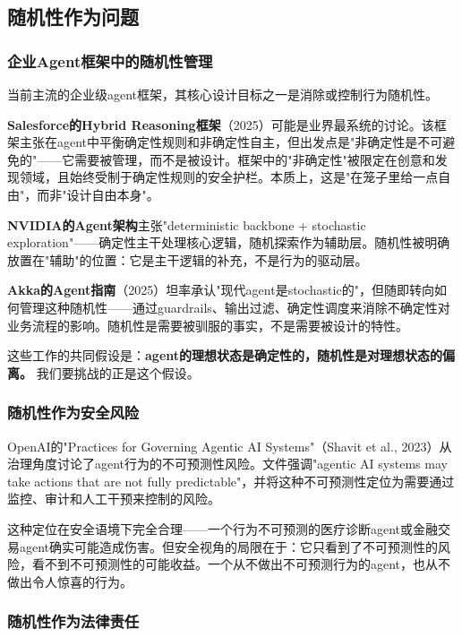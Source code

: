 \documentclass[12pt,a4paper]{ctexart}
\begin{document}
\subsection{随机性作为问题}

\subsubsection{企业Agent框架中的随机性管理}

当前主流的企业级agent框架，其核心设计目标之一是消除或控制行为随机性。

\textbf{Salesforce的Hybrid Reasoning框架}（2025）\cite{salesforce2025}可能是业界最系统的讨论。该框架主张在agent中平衡确定性规则和非确定性自主，但出发点是"非确定性是不可避免的"——它需要被管理，而不是被设计。框架中的"非确定性"被限定在创意和发现领域，且始终受制于确定性规则的安全护栏。本质上，这是"在笼子里给一点自由"，而非"设计自由本身"。

\textbf{NVIDIA的Agent架构}主张"deterministic backbone + stochastic exploration"——确定性主干处理核心逻辑，随机探索作为辅助层。随机性被明确放置在"辅助"的位置：它是主干逻辑的补充，不是行为的驱动层。

\textbf{Akka的Agent指南}（2025）\cite{akka2025}坦率承认"现代agent是stochastic的"，但随即转向如何管理这种随机性——通过guardrails、输出过滤、确定性调度来消除不确定性对业务流程的影响。随机性是需要被驯服的事实，不是需要被设计的特性。

这些工作的共同假设是：\textbf{agent的理想状态是确定性的，随机性是对理想状态的偏离。} 我们要挑战的正是这个假设。

\subsubsection{随机性作为安全风险}

OpenAI的"Practices for Governing Agentic AI Systems"（Shavit et al., 2023）\cite{shavit2023}从治理角度讨论了agent行为的不可预测性风险。文件强调"agentic AI systems may take actions that are not fully predictable"，并将这种不可预测性定位为需要通过监控、审计和人工干预来控制的风险。

这种定位在安全语境下完全合理——一个行为不可预测的医疗诊断agent或金融交易agent确实可能造成伤害。但安全视角的局限在于：它只看到了不可预测性的风险，看不到不可预测性的可能收益。一个从不做出不可预测行为的agent，也从不做出令人惊喜的行为。

\subsubsection{随机性作为法律责任}
\end{document}
